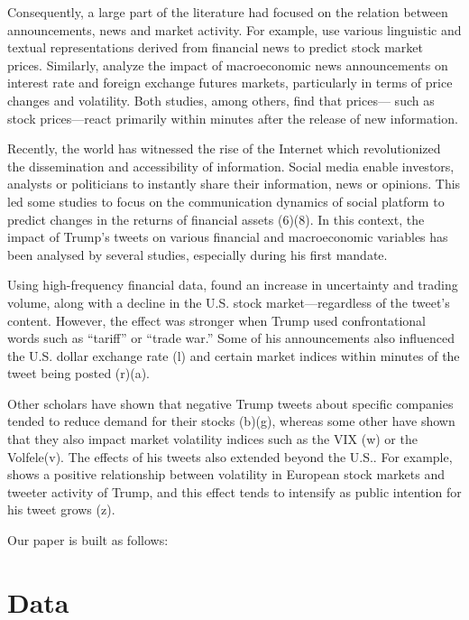 \documentclass[
]{book}
\begin{document}
Consequently, a large part of the literature had focused on the relation
between announcements, news and market activity. For example,
\citet{schumakerTextualAnalysisStock2009} use various linguistic and textual
representations derived from financial news to predict stock market
prices. Similarly, \citet{ederingtonHowMarketsProcess1993} analyze the impact
of macroeconomic news announcements on interest rate and foreign
exchange futures markets, particularly in terms of price changes and
volatility. Both studies, among others, find that prices--- such as stock
prices---react primarily within minutes after the release of new
information.

Recently, the world has witnessed the rise of the Internet
which revolutionized the dissemination and accessibility of information.
Social media enable investors, analysts or politicians to instantly
share their information, news or opinions. This led some studies to
focus on the communication dynamics of social platform to predict
changes in the returns of financial assets (6)(8). In this context, the
impact of Trump's tweets on various financial and macroeconomic
variables has been analysed by several studies, especially during his
first mandate.

Using high-frequency financial data,
\citet{gjerstadPresidentTrumpsTweets2021} found an increase in uncertainty and
trading volume, along with a decline in the U.S. stock market---regardless
of the tweet's content. However, the effect was stronger when Trump used
confrontational words such as ``tariff'' or ``trade war.'' Some of his
announcements also influenced the U.S. dollar exchange rate (l) and
certain market indices within minutes of the tweet being posted (r)(a).

Other scholars have shown that negative Trump tweets about specific
companies tended to reduce demand for their stocks (b)(g), whereas some
other have shown that they also impact market volatility indices such as
the VIX (w) or the Volfele(v). The effects of his tweets also extended
beyond the U.S.. For example, \citet{nishimuraImpactsDonaldTrumps2025} shows a
positive relationship between volatility in European stock markets and
tweeter activity of Trump, and this effect tends to intensify as public
intention for his tweet grows (z).

Our paper is built as follows:

\chapter{Data}\label{data}
\end{document}
